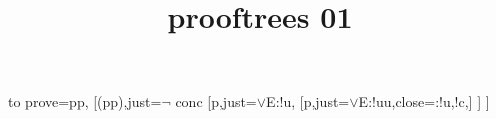 \documentclass{article}
\title{prooftrees 01}
\begin{document}
\begin{tableau}{%
    to prove=\vdash p\vee\lnot p,
  }
  [\lnot(p\vee\lnot p),just=$\lnot$ conc
    [\lnot p,just=$\vee$E:!u,
      [\lnot\lnot p,just=$\vee$E:!uu,close={:!u,!c},]
    ]
  ]
\end{tableau}%
\end{document}
